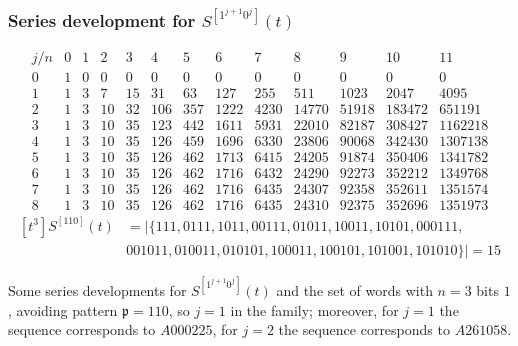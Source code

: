 \documentclass{beamer}
\begin{document}
\begin{frame}\frametitle{Series development for $S^{[1^{j+1}0^{j}]}(t)$}
{\tiny
\begin{table}
\begin{equation*}\begin{array}{c|cccccccccccc}j/n & 0 & 1 & 2 & 3 & 4 & 5 & 6 & 7 & 8 & 9 & 10 & 11\\\hline0 & 1 & 0 & 0 & 0 & 0 & 0 & 0 & 0 & 0 & 0 & 0 & 0\\1 & 1 & 3 & 7 & 15 & 31 & 63 & 127 & 255 & 511 & 1023 & 2047 & 4095\\2 & 1 & 3 & 10 & 32 & 106 & 357 & 1222 & 4230 & 14770 & 51918 & 183472 & 651191\\3 & 1 & 3 & 10 & 35 & 123 & 442 & 1611 & 5931 & 22010 & 82187 & 308427 & 1162218\\4 & 1 & 3 & 10 & 35 & 126 & 459 & 1696 & 6330 & 23806 & 90068 & 342430 & 1307138\\5 & 1 & 3 & 10 & 35 & 126 & 462 & 1713 & 6415 & 24205 & 91874 & 350406 & 1341782\\6 & 1 & 3 & 10 & 35 & 126 & 462 & 1716 & 6432 & 24290 & 92273 & 352212 & 1349768\\7 & 1 & 3 & 10 & 35 & 126 & 462 & 1716 & 6435 & 24307 & 92358 & 352611 & 1351574\\8 & 1 & 3 & 10 & 35 & 126 & 462 & 1716 & 6435 & 24310 & 92375 & 352696 & 1351973\end{array}\end{equation*}
\begin{displaymath}
\begin{split}
[t^{3}]S^{[110]}(t) &= \big|\lbrace 111, 0111, 1011, 00111, 01011, 10011, 10101, 000111, \\
& 001011, 010011, 010101, 100011, 100101, 101001, 101010\rbrace\big| = 15
\end{split}
\end{displaymath}
\caption{Some series developments for $S^{[1^{j+1}0^j]}(t)$ and the set of
words with $n=3$ bits $1$, avoiding pattern $\mathfrak{p}=110$, so $j=1$ in the
family; moreover, for $j=1$ the sequence corresponds to $A000225$, for $j=2$ the
sequence corresponds to $A261058$.}
\end{table}
}
\end{frame}
\end{document}
